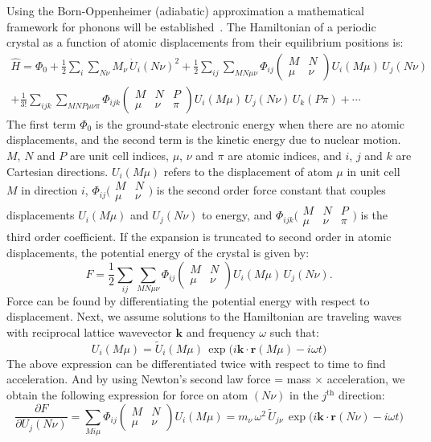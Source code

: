 \documentclass[11pt]{article}
\numberwithin{equation}{section}
\newcommand{\idx}[2]{\begin{pmatrix}#1\\#2\end{pmatrix}}
\newcommand{\sidx}[2]{\bigl(\begin{smallmatrix}#1\\#2\end{smallmatrix}\bigr)}
\begin{document}
Using the Born-Oppenheimer (adiabatic) approximation a mathematical framework
for phonons will be established~\cite{dove}. The Hamiltonian of a periodic
crystal as a function of atomic displacements from their equilibrium
positions is:
\begin{multline}
\hat{H} = \Phi_0
+ \frac{1}{2}\sum_{i}\sum_{N\nu} M_\nu\,\dot{U}_i(N\nu)^2
+ \frac{1}{2}\sum_{ij}\sum_{MN\mu\nu} \Phi_{ij}\idx{M & N}{\mu & \nu} U_i(M\mu)\,U_j(N\nu) \\
+ \frac{1}{3!}\sum_{ijk}\sum_{MNP\mu\nu\pi} \Phi_{ijk}\idx{M & N & P}{\mu & \nu & \pi} U_i(M\mu)\,U_j(N\nu)\,U_k(P\pi)
+ \cdots
\end{multline}
The first term $\Phi_0$ is the ground-state electronic energy when there are
no atomic displacements, and the second term is the kinetic energy due to
nuclear motion. $M$, $N$ and $P$ are unit cell indices, $\mu$, $\nu$ and
$\pi$ are atomic indices, and $i$, $j$ and $k$ are Cartesian directions.
$U_i(M\mu)$ refers to the displacement of atom $\mu$ in unit cell $M$ in
direction $i$, $\Phi_{ij}\sidx{M & N}{\mu & \nu}$ is the second order force
constant that couples displacements $U_i(M\mu)$ and $U_j(N\nu)$ to energy,
and $\Phi_{ijk}\sidx{M & N & P}{\mu & \nu & \pi}$ is the third order
coefficient. If the expansion is truncated to second order in atomic
displacements, the potential energy of the crystal is given by:
\begin{equation}
F = \frac{1}{2}\sum_{ij}\sum_{MN\mu\nu} \Phi_{ij}\idx{M & N}{\mu & \nu} U_i(M\mu)\,U_j(N\nu).
\end{equation}
Force can be found by differentiating the potential energy with respect to
displacement. Next, we assume solutions to the Hamiltonian are traveling
waves with reciprocal lattice wavevector $\mathbf{k}$ and frequency $\omega$
such that:
\begin{equation}
U_i(M\mu) = \tilde{U}_i(M\mu)\,\exp\!\big(i\mathbf{k}\cdot\mathbf{r}(M\mu) - i\omega t\big)
\end{equation}
The above expression can be differentiated twice with respect to time to find
acceleration. And by using Newton's second law force = mass $\times$
acceleration, we obtain the following expression for force on atom $(N\nu)$
in the $j^{\text{th}}$ direction:
\begin{equation}
\frac{\partial F}{\partial U_j(N\nu)}
= \sum_{Mi\mu} \Phi_{ij}\idx{M & N}{\mu & \nu} U_i(M\mu)
= m_\nu\,\omega^2\,\tilde{U}_{j\nu}\,\exp\!\big(i\mathbf{k}\cdot\mathbf{r}(N\nu) - i\omega t\big)
\end{equation}
\end{document}
